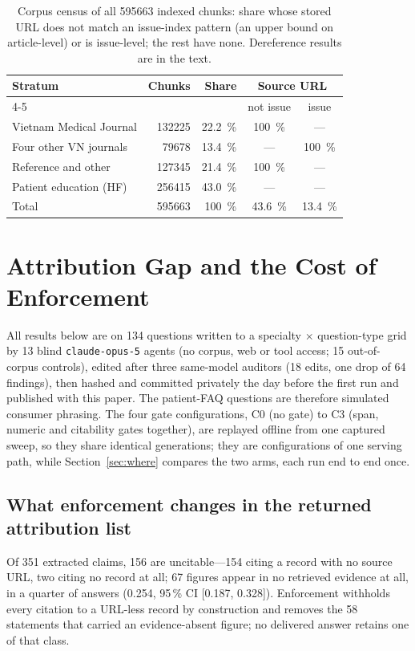 \documentclass[conference,a4paper]{IEEEtran}
\begin{document}
\begin{table}[t]
\caption{Corpus census of all \num{595663} indexed chunks: share whose stored URL does not match an issue-index pattern (an upper bound on article-level) or is issue-level; the rest have none. Dereference results are in the text.}
\label{tab:census}
\centering\small
\begin{tabular}{@{}lrrcc@{}}
\toprule
Stratum & Chunks & Share & \multicolumn{2}{c}{Source URL} \\
\cmidrule(lr){4-5}
 & & & not issue & issue \\
\midrule
Vietnam Medical Journal & \num{132225} & \SI{22.2}{\percent} & \SI{100}{\percent} & --- \\
Four other VN journals  & \num{79678}  & \SI{13.4}{\percent} & --- & \SI{100}{\percent} \\
Reference and other     & \num{127345} & \SI{21.4}{\percent} & \SI{100}{\percent} & --- \\
Patient education (HF)  & \num{256415} & \SI{43.0}{\percent} & --- & --- \\
\midrule
Total                   & \num{595663} & \SI{100}{\percent} & \SI{43.6}{\percent} & \SI{13.4}{\percent} \\
\bottomrule
\end{tabular}
\end{table}

\section{Attribution Gap and the Cost of Enforcement}\label{sec:cost}
All results below are on 134 questions written to a specialty $\times$ question-type grid by
13 blind \texttt{claude-opus-5} agents (no corpus, web or tool access; 15 out-of-corpus
controls), edited after three same-model auditors (18 edits, one drop of 64 findings),
then hashed and committed privately the day before the first run and published with this
paper. The patient-FAQ questions are therefore simulated consumer phrasing. The four gate
configurations, C0 (no gate) to C3 (span, numeric and citability gates together), are
replayed offline from one captured sweep, so they share identical generations; they are
configurations of one serving path, while Section~\ref{sec:where} compares the two arms, each
run end to end once.

\subsection{What enforcement changes in the returned attribution list}
Of 351 extracted claims, \num{156} are uncitable---\num{154} citing a
record with no source URL, two citing no record at all; \num{67} figures appear in no
retrieved evidence at all, in a quarter of answers
(\num{0.254}, 95\,\% CI [\num{0.187}, \num{0.328}]). Enforcement withholds every citation to a
URL-less record by construction and removes the 58 statements that carried an
evidence-absent figure; no delivered answer retains one of that class.
\end{document}
